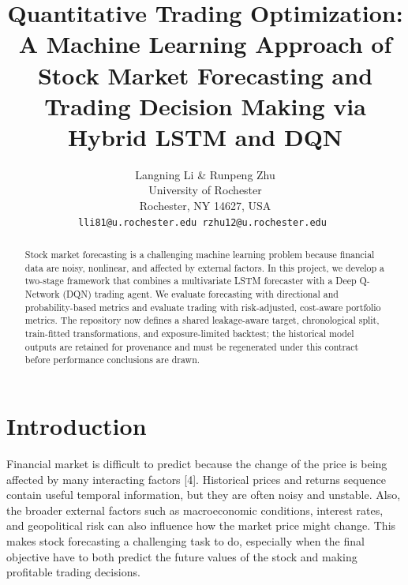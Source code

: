 \documentclass{article}
\title{ Quantitative Trading Optimization: A Machine Learning Approach of Stock Market Forecasting and Trading Decision Making via Hybrid LSTM and DQN}
\author{
Langning Li \& Runpeng Zhu \\
University of Rochester \\
Rochester, NY 14627, USA \\
\texttt{lli81@u.rochester.edu \quad rzhu12@u.rochester.edu }
}
\begin{document}
\maketitle

\begin{center}
\end{center}

\begin{abstract}
Stock market forecasting is a challenging machine learning problem because financial data are noisy, nonlinear, and affected by external factors. In this project, we develop a two-stage framework that combines a multivariate LSTM forecaster with a Deep Q-Network (DQN) trading agent. We evaluate forecasting with directional and probability-based metrics and evaluate trading with risk-adjusted, cost-aware portfolio metrics. The repository now defines a shared leakage-aware target, chronological split, train-fitted transformations, and exposure-limited backtest; the historical model outputs are retained for provenance and must be regenerated under this contract before performance conclusions are drawn.

\end{abstract}

\section{Introduction}
Financial market is difficult to predict because the change of the price is being affected by many interacting factors [4]. Historical prices and returns sequence contain useful temporal information, but they are often noisy and unstable. Also, the broader external factors such as macroeconomic conditions, interest rates, and geopolitical risk can also influence how the market price might change. This makes stock forecasting a challenging task to do, especially when the final objective have to both predict the future values of the stock and making profitable trading decisions.
\end{document}
